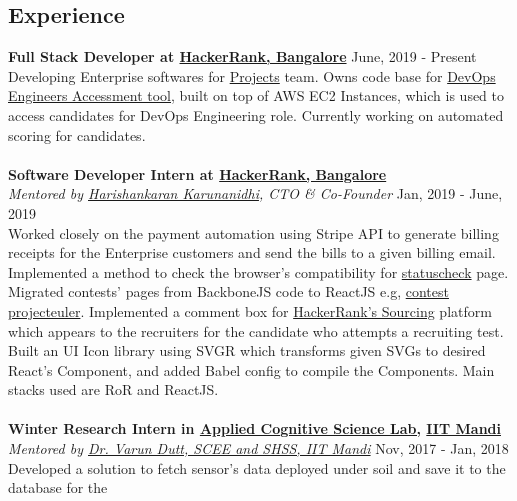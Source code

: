 \documentclass[margin, centered]{res}
\begin{document}
\begin{resume}
        \section{Experience}
            \textbf{Full Stack Developer at \href{https://www.hackerrank.com}{HackerRank, Bangalore}} \hfill June, 2019 - Present \\
            Developing Enterprise softwares for \href{https://www.hackerrank.com/products/projects}{Projects} team. Owns code base for \href{https://www.hackerrank.com/products/projects#role5}{DevOps Engineers Accessment tool},
            built on top of AWS EC2 Instances, which is used to access candidates for DevOps Engineering role. Currently working on automated scoring for candidates.\\
            \\
            \textbf{Software Developer Intern at \href{https://www.hackerrank.com}{HackerRank, Bangalore}} \\
            \emph{Mentored by \href{https://www.hackerrank.com/about-us/our-team/}{Harishankaran
            Karunanidhi}\footnotesize{, CTO \& Co-Founder}} \hfill Jan, 2019 - June, 2019 \\
            Worked closely on the payment automation using Stripe API to generate billing receipts for
            the Enterprise customers and send the bills to a given billing email. Implemented a method to check the browser's compatibility
            for \href{https://www.hackerrank.com/statuscheck}{statuscheck} page. Migrated contests' pages from
            BackboneJS code to ReactJS e.g, \href{https://www.hackerrank.com/projecteuler/}{contest projecteuler}.
            Implemented a comment box for \href{https://www.hackerrank.com/work}{HackerRank's Sourcing} platform
            which appears to the recruiters for the candidate who attempts a recruiting test. Built an UI Icon library
            using SVGR which transforms given SVGs to desired React's Component, and added Babel config to compile
            the Components. Main stacks used are RoR and ReactJS. \\
            \\
            \textbf{Winter Research Intern in \href{http://acslab.org}{Applied Cognitive Science Lab,} \href{https://iitmandi.ac.in/}{IIT Mandi}} \\
            \emph{Mentored by \href{https://faculty.iitmandi.ac.in/~varun/}{Dr. Varun Dutt, SCEE and SHSS, IIT Mandi}} \hfill Nov, 2017 - Jan, 2018 \\
            Developed a solution to fetch sensor’s data deployed under soil and save it to the database for the

\end{resume}
\end{document}
